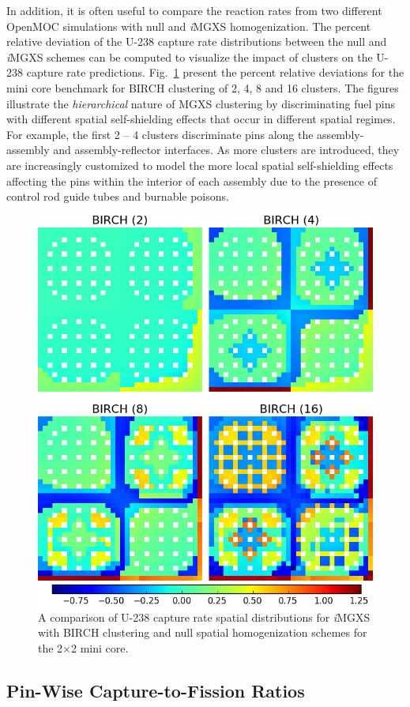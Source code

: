 \documentclass[12pt,twoside]{mitthesis-exec}
\begin{document}
In addition, it is often useful to compare the reaction rates from two different OpenMOC simulations with null and \textit{i}MGXS homogenization. The percent relative deviation of the U-238 capture rate distributions between the null and \textit{i}MGXS schemes can be computed to visualize the impact of clusters on the U-238 capture rate predictions. Fig.~\ref{fig:refl-capt-rates-comp} present the percent relative deviations for the mini core benchmark for BIRCH clustering of 2, 4, 8 and 16 clusters. The figures illustrate the \textit{hierarchical} nature of MGXS clustering by discriminating fuel pins with different spatial self-shielding effects that occur in different spatial regimes. For example, the first 2 -- 4 clusters discriminate pins along the assembly-assembly and assembly-reflector interfaces. As more clusters are introduced, they are increasingly customized to model the more local spatial self-shielding effects affecting the pins within the interior of each assembly due to the presence of control rod guide tubes and burnable poisons.

\begin{figure}[h!]
\centering
\includegraphics[width=0.63\linewidth]{figures/results/compare/reflector/compare-capt}
\caption[U-238 capture rate comparison for the mini core]{A comparison of U-238 capture rate spatial distributions for \textit{i}MGXS with BIRCH clustering and null spatial homogenization schemes for the 2$\times$2 mini core.}
\label{fig:refl-capt-rates-comp}
\end{figure}

\subsection*{Pin-Wise Capture-to-Fission Ratios}
\end{document}
